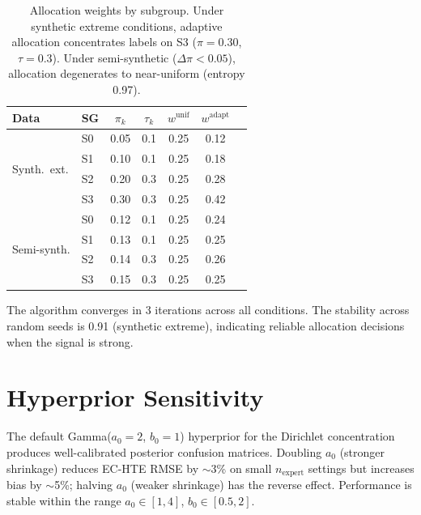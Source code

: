 \documentclass[11pt,a4paper]{article}
\begin{document}
\begin{table}[h]
\centering
\small
\begin{tabular}{@{}llccccc@{}}
\toprule
\textbf{Data} & \textbf{SG} & $\pi_k$ & $\tau_k$ & $w^{\text{unif}}$ & $w^{\text{adapt}}$ \\
\midrule
\multirow{4}{*}{Synth.\ ext.} & S0 & 0.05 & 0.1 & 0.25 & 0.12 \\
 & S1 & 0.10 & 0.1 & 0.25 & 0.18 \\
 & S2 & 0.20 & 0.3 & 0.25 & 0.28 \\
 & S3 & 0.30 & 0.3 & 0.25 & 0.42 \\
\midrule
\multirow{4}{*}{Semi-synth.} & S0 & 0.12 & 0.1 & 0.25 & 0.24 \\
 & S1 & 0.13 & 0.1 & 0.25 & 0.25 \\
 & S2 & 0.14 & 0.3 & 0.25 & 0.26 \\
 & S3 & 0.15 & 0.3 & 0.25 & 0.25 \\
\bottomrule
\end{tabular}
\caption{Allocation weights by subgroup. Under synthetic extreme conditions, adaptive allocation concentrates labels on S3 ($\pi=0.30$, $\tau=0.3$). Under semi-synthetic ($\Delta\pi < 0.05$), allocation degenerates to near-uniform (entropy 0.97).}
\label{tab:allocation_weights}
\end{table}

The algorithm converges in 3 iterations across all conditions.
The stability across random seeds is 0.91 (synthetic extreme), indicating reliable allocation decisions when the signal is strong.

\section{Hyperprior Sensitivity}
\label{app:hyperprior}

The default Gamma($a_0=2$, $b_0=1$) hyperprior for the Dirichlet concentration produces well-calibrated posterior confusion matrices.
Doubling $a_0$ (stronger shrinkage) reduces EC-HTE RMSE by $\sim$3\% on small $n_{\text{expert}}$ settings but increases bias by $\sim$5\%; halving $a_0$ (weaker shrinkage) has the reverse effect.
Performance is stable within the range $a_0 \in [1, 4]$, $b_0 \in [0.5, 2]$.
\end{document}
